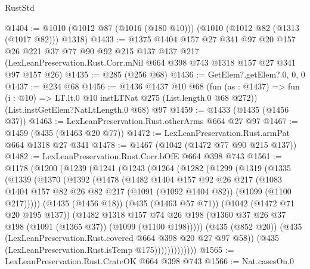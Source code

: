 \begin{lexlean}{RustStd}
\begin{coremodule}
@1404 := @1010 (@1012 @87 (@1016 (@180 @10))) (@1010 (@1012 @82 (@1313 (@1017 @82))) @1318)
@1433 := @1375
    @1404
    @157
    @27
    @341
    @97
    @20
    @157
    @26
    @221
    @37
    @77
    @90
    @92
    @215
    @137
    @137
    @217
    (LexLeanPreservation.Rust.Corr.mNil @664 @398 @743 @1318 @157 @27 @341 @97 @157 @26)
@1435 := @285 (@256 @68)
@1436 := GetElem?.getElem?.{0, 0, 0}
@1437 := @234 @68
@1456 := @1436
    @1437
    @10
    @68
    (fun (as : @1437) => fun (i : @10) => LT.lt.{0} @10 instLTNat @275 (List.length.{0} @68 @272))
    (List.instGetElem?NatLtLength.{0} @68)
    @97
@1459 := @1433 (@1435 (@1456 @37))
@1463 := LexLeanPreservation.Rust.otherArms @664 @27 @97
@1467 := @1459 (@435 (@1463 @20 @77))
@1472 := LexLeanPreservation.Rust.armPat @664 @1318 @27 @341
@1478 := @1467 (@1042 (@1472 @77 @90 @215 @137))
@1482 := LexLeanPreservation.Rust.Corr.bOfE @664 @398 @743
@1561 := @1178
    (@1200
      (@1239
        (@1241
          (@1243
            (@1264
              (@1282
                (@1299
                  (@1319
                    (@1335
                      (@1339
                        (@1370
                          (@1392
                            (@1478
                              (@1482
                                @1404
                                @157
                                @92
                                @26
                                @217
                                (@1083
                                  @1404
                                  @157
                                  @82
                                  @26
                                  @82
                                  @217
                                  (@1091 (@1092 @1404 @82))
                                  (@1099 (@1100 @217)))))
                            (@1435 (@1456 @18))
                            (@435 (@1463 @57 @71))
                            (@1042 (@1472 @71 @20 @195 @137))
                            (@1482
                              @1318
                              @157
                              @74
                              @26
                              @198
                              (@1360 @37 @26 @37 @198 (@1091 (@1365 @37)) (@1099 (@1100 @198)))))
                          (@435 (@852 @20))
                          (@435 (LexLeanPreservation.Rust.covered @664 @398 @20 @27 @97 @58))
                          (@435 (LexLeanPreservation.Rust.isTemp @175)))))))))))))
@1565 := LexLeanPreservation.Rust.CrateOK @664 @398 @743
@1566 := Nat.casesOn.{0}

\end{coremodule}
\end{lexlean}
